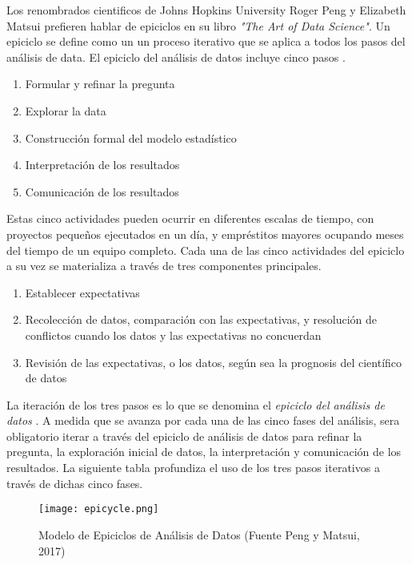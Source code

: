 \begin{spacing}{1.5}
Los renombrados cientificos de Johns Hopkins University Roger Peng y Elizabeth Matsui prefieren hablar de epiciclos en su libro \emph{"The Art of Data Science"}. Un epiciclo se define como un un proceso iterativo que se aplica a todos los pasos del análisis de data. El epiciclo del análisis de datos incluye cinco pasos \cite{pengMatsui}.

\begin{enumerate}
	\item Formular y refinar la pregunta
	\item Explorar la data
    \item Construcción formal del modelo estadístico
    \item Interpretación de los resultados
    \item Comunicación de los resultados
\end{enumerate}

Estas cinco actividades pueden ocurrir en diferentes escalas de tiempo, con proyectos pequeños ejecutados en un día, y empréstitos mayores ocupando meses del tiempo de un equipo completo. Cada una de las cinco actividades del epiciclo a su vez se materializa a través de tres componentes principales.

\begin{enumerate}
	\item Establecer expectativas
    \item Recolección de datos, comparación con las expectativas, y resolución de conflictos cuando los datos y las expectativas no concuerdan
    \item Revisión de las expectativas, o los datos, según sea la prognosis del científico de datos
\end{enumerate}

La iteración de los tres pasos es lo que se denomina el \emph{epiciclo del análisis de datos} \cite{pengMatsui}. A medida que se avanza por cada una de las cinco fases del análisis, sera obligatorio iterar a través del epiciclo de análisis de datos para refinar la pregunta, la exploración inicial de datos, la interpretación y comunicación de los resultados. La siguiente tabla profundiza el uso de los tres pasos iterativos a través de dichas cinco fases. 

\begin{figure}[h!]
    \centering
    \texttt{[image: epicycle.png]}
    \caption{Modelo de Epiciclos de Análisis de Datos (Fuente Peng y Matsui, 2017)}
\end{figure}


\end{spacing}
